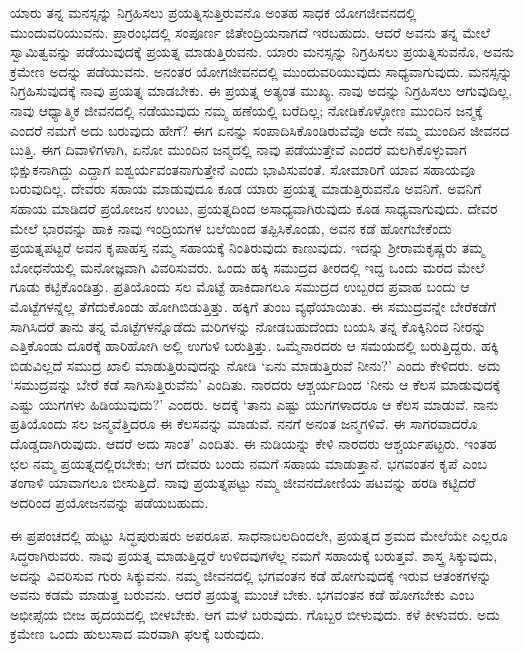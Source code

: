 ಯಾರು ತನ್ನ ಮನಸ್ಸನ್ನು ನಿಗ್ರಹಿಸಲು ಪ್ರಯತ್ನಿಸುತ್ತಿರುವನೊ ಅಂತಹ ಸಾಧಕ ಯೋಗ\-ಜೀವನದಲ್ಲಿ ಮುಂದುವರಿಯುವನು. ಪ್ರಾರಂಭದಲ್ಲಿ ಸಂಪೂರ್ಣ ಜಿತೇಂದ್ರಿಯನಾಗದೆ ಇರಬಹುದು. ಆದರೆ ಅವನು ತನ್ನ ಮೇಲೆ ಸ್ವಾಮಿತ್ವವನ್ನು ಪಡೆಯುವುದಕ್ಕೆ ಪ್ರಯತ್ನ ಮಾಡುತ್ತಿರು\-ವನು. ಯಾರು ಮನಸ್ಸನ್ನು ನಿಗ್ರಹಿಸಲು ಪ್ರಯತ್ನಿಸುವನೊ, ಅವನು ಕ್ರಮೇಣ ಅದನ್ನು ಪಡೆಯುವನು. ಅನಂತರ ಯೋಗಜೀವನದಲ್ಲಿ ಮುಂದುವರಿಯುವುದು ಸಾಧ್ಯವಾಗುವುದು. ಮನಸ್ಸನ್ನು ನಿಗ್ರಹಿಸುವುದಕ್ಕೆ ನಾವು ಪ್ರಯತ್ನ ಮಾಡಬೇಕು. ಈ ಪ್ರಯತ್ನ ಅತ್ಯಂತ ಮುಖ್ಯ. ನಾವು ಅದನ್ನು ನಿಗ್ರಹಿಸಲು ಆಗುವುದಿಲ್ಲ. ನಾವು ಆಧ್ಯಾತ್ಮಿಕ ಜೀವನದಲ್ಲಿ ನಡೆಯುವುದು ನಮ್ಮ ಹಣೆಯಲ್ಲಿ ಬರೆದಿಲ್ಲ; ನೋಡಿಕೊಳ್ಳೋಣ ಮುಂದಿನ ಜನ್ಮಕ್ಕೆ ಎಂದರೆ ನಮಗೆ ಅದು ಬರುವುದು ಹೇಗೆ? ಈಗ ಏನನ್ನು ಸಂಪಾದಿಸಿಕೊಂಡಿರುವೆವೊ ಅದೇ ನಮ್ಮ ಮುಂದಿನ ಜೀವನದ ಬುತ್ತಿ. ಈಗ ದಿವಾಳಿಗಳಾಗಿ, ಏನೋ ಮುಂದಿನ ಜನ್ಮದಲ್ಲಿ ನಾವು ಪಡೆಯುತ್ತೇವೆ ಎಂದರೆ ಮಲಗಿಕೊಳ್ಳುವಾಗ ಭಿಕ್ಷುಕನಾಗಿದ್ದು ಎದ್ದಾಗ ಐಶ್ವರ್ಯವಂತನಾಗುತ್ತೇನೆ ಎಂದು ಭಾವಿಸುವಂತೆ. ಸೋಮಾರಿಗೆ ಯಾವ ಸಹಾಯವೂ ಬರುವುದಿಲ್ಲ. ದೇವರು ಸಹಾಯ ಮಾಡುವುದೂ ಕೂಡ ಯಾರು ಪ್ರಯತ್ನ ಮಾಡುತ್ತಿರುವನೊ ಅವನಿಗೆ. ಅವನಿಗೆ ಸಹಾಯ ಮಾಡಿದರೆ ಪ್ರಯೋಜನ ಉಂಟು, ಪ್ರಯತ್ನದಿಂದ ಅಸಾಧ್ಯವಾಗಿರುವುದು ಕೂಡ ಸಾಧ್ಯವಾಗುವುದು. ದೇವರ ಮೇಲೆ ಭಾರವನ್ನು ಹಾಕಿ ನಾವು ಇಂದ್ರಿಯಗಳ ಬಲೆಯಿಂದ ತಪ್ಪಿಸಿಕೊಂಡು, ಅವನ ಕಡೆ ಹೋಗಬೇಕೆಂದು ಪ್ರಯತ್ನಪಟ್ಟರೆ ಅವನ ಕೃಪಾಹಸ್ತ ನಮ್ಮ ಸಹಾಯಕ್ಕೆ ನಿಂತಿರುವುದು ಕಾಣುವುದು. ಇದನ್ನು ಶ‍್ರೀರಾಮಕೃಷ್ಣರು ತಮ್ಮ ಬೋಧನೆಯಲ್ಲಿ ಮನೋಜ್ಞವಾಗಿ ವಿವರಿಸುವರು. ಒಂದು ಹಕ್ಕಿ ಸಮುದ್ರದ ತೀರದಲ್ಲಿ ಇದ್ದ ಒಂದು ಮರದ ಮೇಲೆ ಗೂಡು ಕಟ್ಟಿಕೊಂಡಿತ್ತು. ಪ್ರತಿಯೊಂದು ಸಲ ಮೊಟ್ಟೆ ಹಾಕಿದಾಗಲೂ ಸಮುದ್ರದ ಉಬ್ಬರದ ಪ್ರವಾಹ ಬಂದು ಆ ಮೊಟ್ಟೆಗಳನ್ನೆಲ್ಲ ತೆಗೆದುಕೊಂಡು ಹೋಗಿಬಿಡುತ್ತಿತ್ತು. ಹಕ್ಕಿಗೆ ತುಂಬ ವ್ಯಥೆಯಾಯಿತು. ಈ ಸಮುದ್ರವನ್ನೇ ಬೇರೆಕಡೆಗೆ ಸಾಗಿಸಿದರೆ ತಾನು ತನ್ನ ಮೊಟ್ಟೆಗಳನ್ನೊಡೆದು ಮರಿಗಳನ್ನು ನೋಡಬಹುದೆಂದು ಬಯಸಿ ತನ್ನ ಕೊಕ್ಕಿನಿಂದ ನೀರನ್ನು ಎತ್ತಿಕೊಂಡು ದೂರಕ್ಕೆ ಹಾರಿಹೋಗಿ ಅಲ್ಲಿ ಉಗುಳಿ ಬರುತ್ತಿತ್ತು. ಒಮ್ಮೆ\break ನಾರದರು ಆ ಸಮಯದಲ್ಲಿ ಬರುತ್ತಿದ್ದರು. ಹಕ್ಕಿ ಬಿಡುವಿಲ್ಲದೆ ಸಮುದ್ರ ಖಾಲಿ ಮಾಡುತ್ತಿರುವುದನ್ನು ನೋಡಿ ‘ಏನು ಮಾಡುತ್ತಿರುವೆ ನೀನು?’ ಎಂದು ಕೇಳಿದರು. ಅದು ‘ಸಮುದ್ರವನ್ನು ಬೇರೆ ಕಡೆ ಸಾಗಿಸುತ್ತಿರುವೆನು’ ಎಂದಿತು. ನಾರದರು ಆಶ್ಚರ್ಯದಿಂದ ‘ನೀನು ಆ ಕೆಲಸ ಮಾಡುವುದಕ್ಕೆ ಎಷ್ಟು ಯುಗಗಳು ಹಿಡಿಯುವುದು?’ ಎಂದರು. ಅದಕ್ಕೆ ‘ತಾನು ಎಷ್ಟು ಯುಗಗಳಾದರೂ ಆ ಕೆಲಸ ಮಾಡುವೆ. ನಾನು ಪ್ರತಿಯೊಂದು ಸಲ ಜನ್ಮವೆತ್ತಿದರೂ ಈ ಕೆಲಸವನ್ನು ಮಾಡುವೆ. ನನಗೆ ಅನಂತ ಜನ್ಮಗಳಿವೆ. ಈ ಸಾಗರವಾದರೊ ದೊಡ್ಡದಾಗಿರುವುದು. ಆದರೆ ಅದು ಸಾಂತ’ ಎಂದಿತು. ಈ ನುಡಿಯನ್ನು ಕೇಳಿ ನಾರದರು ಆಶ್ಚರ್ಯಪಟ್ಟರು. ಇಂತಹ ಛಲ ನಮ್ಮ ಪ್ರಯತ್ನದಲ್ಲಿರಬೇಕು; ಆಗ ದೇವರು ಬಂದು ನಮಗೆ ಸಹಾಯ ಮಾಡುತ್ತಾನೆ. ಭಗವಂತನ ಕೃಪೆ ಎಂಬ ತಂಗಾಳಿ ಯಾವಾಗಲೂ ಬೀಸುತ್ತಿದೆ. ನಾವು ಪ್ರಯತ್ನಪಟ್ಟು ನಮ್ಮ ಜೀವನದೋಣಿಯ ಪಟವನ್ನು ಹರಡಿ ಕಟ್ಟಿದರೆ ಅದರಿಂದ ಪ್ರಯೋಜನವನ್ನು ಪಡೆಯಬಹುದು.

ಈ ಪ್ರಪಂಚದಲ್ಲಿ ಹುಟ್ಟು ಸಿದ್ಧಪುರುಷರು ಅಪರೂಪ. ಸಾಧನಾಬಲದಿಂದಲೇ, ಪ್ರಯತ್ನದ ಶ್ರಮದ ಮೇಲೆಯೇ ಎಲ್ಲರೂ ಸಿದ್ಧರಾಗಿರುವರು. ನಾವು ಪ್ರಯತ್ನ ಮಾಡುತ್ತಿದ್ದರೆ ಉಳಿದವುಗಳೆಲ್ಲ ನಮಗೆ ಸಹಾಯಕ್ಕೆ ಬರುತ್ತವೆ. ಶಾಸ್ತ್ರ ಸಿಕ್ಕುವುದು, ಅದನ್ನು ವಿವರಿಸುವ ಗುರು ಸಿಕ್ಕುವನು. ನಮ್ಮ ಜೀವನದಲ್ಲಿ ಭಗವಂತನ ಕಡೆ ಹೋಗುವುದಕ್ಕೆ ಇರುವ ಆತಂಕಗಳನ್ನು ಅವನು ಕಡಮೆ ಮಾಡುತ್ತ ಬರುವನು. ಆದರೆ ಪ್ರಯತ್ನ ಮುಂಚೆ ಬೇಕು. ಭಗವಂತನ ಕಡೆ ಹೋಗಬೇಕು ಎಂಬ ಅಭೀಪ್ಸೆಯ ಬೀಜ ಹೃದಯದಲ್ಲಿ ಬೀಳಬೇಕು. ಆಗ ಮಳೆ ಬರುವುದು. ಗೊಬ್ಬರ ಬೀಳುವುದು. ಕಳೆ ಕೀಳುವರು. ಅದು ಕ್ರಮೇಣ ಒಂದು ಹುಲುಸಾದ ಮರವಾಗಿ ಫಲಕ್ಕೆ ಬರುವುದು.

